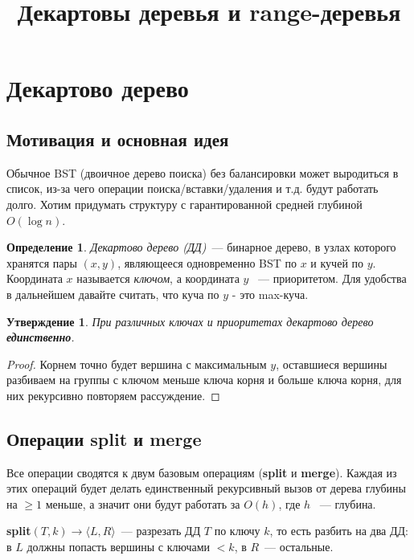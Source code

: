 \documentclass[12pt, a4paper]{article}
\title{\textbf{Декартовы деревья и range-деревья}}
\author{}
\date{}
\theoremstyle{definition}
\newtheorem*{definition}{Определение}
\theoremstyle{plain}
\newtheorem*{statement}{Утверждение}
\theoremstyle{remark}
\begin{document}
\maketitle
\tableofcontents
\newpage

\section{Декартово дерево}

\subsection{Мотивация и основная идея}

Обычное BST (двоичное дерево поиска) без балансировки может выродиться в список, из-за чего операции поиска/вставки/удаления и т.д. будут работать долго. Хотим придумать структуру с гарантированной средней глубиной $O(\log n)$.

\begin{definition}
\textit{Декартово дерево (ДД)}~--- бинарное дерево, в узлах которого хранятся
пары $(x, y)$, являющееся одновременно BST по $x$ и кучей
по $y$. Координата $x$ называется \textit{ключом}, а координата $y$ ~--- приоритетом. Для удобства в дальнейшем давайте считать, что куча по $y$ - это max-куча. 
\end{definition}

\begin{statement}
При различных ключах и приоритетах декартово дерево \textbf{единственно}.
\end{statement}

\begin{proof}
Корнем точно будет вершина с максимальным $y$, оставшиеся вершины разбиваем на группы с ключом меньше ключа корня и больше ключа корня, для них рекурсивно повторяем рассуждение.
\end{proof}
\subsection{Операции split и merge}

Все операции сводятся к двум базовым операциям (\textbf{split} и \textbf{merge}). Каждая из этих операций будет делать единственный рекурсивный вызов от дерева глубины на $\geq 1$ меньше, а значит они будут работать за $O(h)$, где $h$ ~--- глубина.

\medskip
\noindent\textbf{split}$(T, k) \to \langle L, R \rangle$~--- разрезать ДД $T$ по ключу $k$, то есть разбить на два ДД: в $L$ должны попасть вершины с ключами $< k$, в $R$~--- остальные.
\end{document}
